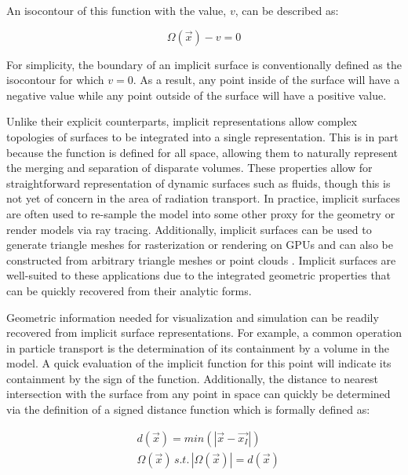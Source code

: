 An isocontour of this function with the value, $v$, can be described as:

\begin{equation}
  \Omega(\vec{x}) - v  = 0
\end{equation}

For simplicity, the boundary of an implicit surface is conventionally defined as
the isocontour for which $v=0$. As a result, any point inside of the surface
will have a negative value while any point outside of the surface will have a
positive value.

Unlike their explicit counterparts, implicit representations allow complex
topologies of surfaces to be integrated into a single representation. This is in
part because the function is defined for all space, allowing them to naturally
represent the merging and separation of disparate volumes. These properties
allow for straightforward representation of dynamic surfaces such as fluids,
though this is not yet of concern in the area of radiation transport. In
practice, implicit surfaces are often used to re-sample the model into some
other proxy for the geometry or render models via ray tracing. Additionally,
implicit surfaces can be used to generate triangle meshes for rasterization or
rendering on GPUs \cite{Sethian_1996} and can also be constructed from arbitrary
triangle meshes or point clouds \cite{Sigg_2006}. Implicit surfaces are
well-suited to these applications due to the integrated geometric properties
that can be quickly recovered from their analytic forms.

Geometric information needed for visualization and simulation can be
readily recovered from implicit surface representations. For example, a common
operation in particle transport is the determination of its containment by a
volume in the model. A quick evaluation of the implicit function for this point
will indicate its containment by the sign of the function.
Additionally, the distance to nearest intersection with the surface from any
point in space can quickly be determined via the definition of a signed distance
function which is formally defined as:

\begin{align} \label{eq:sdf}
  & d(\vec{x}) = min(|\vec{x} - \vec{x_{I}}|) \\
  & \Omega(\vec{x})  \,s.t.  \, |\Omega(\vec{x})| = d(\vec{x})
\end{align}


